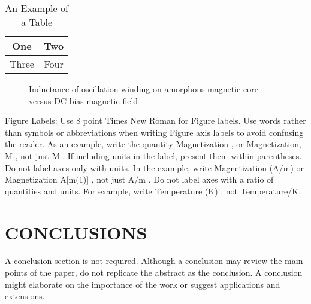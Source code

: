 \documentclass[letterpaper, 10 pt, conference]{ieeeconf}  %
\begin{document}
\begin{table}[h]
\caption{An Example of a Table}
\label{table_example}
\begin{center}
\begin{tabular}{|c||c|}
\hline
One & Two\\
\hline
Three & Four\\
\hline
\end{tabular}
\end{center}
\end{table}


   \begin{figure}[thpb]
      \centering
      \caption{Inductance of oscillation winding on amorphous
       magnetic core versus DC bias magnetic field}
      \label{figurelabel}
   \end{figure}
   

Figure Labels: Use 8 point Times New Roman for Figure labels. Use words rather than symbols or abbreviations when writing Figure axis labels to avoid confusing the reader. As an example, write the quantity  Magnetization , or  Magnetization, M , not just  M . If including units in the label, present them within parentheses. Do not label axes only with units. In the example, write  Magnetization (A/m)  or  Magnetization {A[m(1)]} , not just  A/m . Do not label axes with a ratio of quantities and units. For example, write  Temperature (K) , not  Temperature/K. 

\section{CONCLUSIONS}

A conclusion section is not required. Although a conclusion may review the main points of the paper, do not replicate the abstract as the conclusion. A conclusion might elaborate on the importance of the work or suggest applications and extensions. 

\addtolength{\textheight}{-12cm}   %
\end{document}
